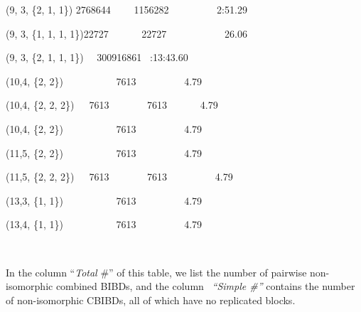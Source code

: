 \documentclass{article}
\newcommand{\tmem}[1]{{\em #1\/}}
\newcommand{\tmstrong}[1]{\textbf{#1}}
\newenvironment{tmparmod}[3]{\begin{list}{}{\setlength{\topsep}{0pt}\setlength{\leftmargin}{#1}\setlength{\rightmargin}{#2}\setlength{\parindent}{#3}\setlength{\listparindent}{\parindent}\setlength{\itemindent}{\parindent}\setlength{\parsep}{\parskip}} \item[]}{\end{list}}
\begin{document}
\begin{tmparmod}{0pt}{0pt}{0tab}
\begin{tmbothlined}
{{    {\hspace{3em}}(9, 3, \{2, 1, 1\}) {\hspace{4em}}2768644 \ \ \ \ 1156282 \
    \ \ \ \ \ \ \ \ 2:51.29
    
    {\hspace{3em}}(9, 3, \{1, 1, 1, 1\}){\hspace{4em}}22727 \ \ \ \ \ \ 22727
    \ \ \ \ \ \ \ \ \ \ \ 26.06
    
    {\hspace{3em}}(9, 3, \{2, 1, 1, 1\}) \ \ 300916861 \
    :13:43.60}
    
    {\hspace{3em}}(10,4, \{2, 2\})\quad \ \ \ {\hspace{3em}}  \ \ \
    \ \ \ \ 7613 \ \ \ \ \ \ \ \ \quad \ 4.79
    
    {\hspace{3em}}(10,4, \{2, 2, 2\})\quad \ \ \ {\hspace{3em}}7613 \ \ \ \ \
    \ \ 7613 \ \ \ \ \ \ {\hspace{3em}}4.79
    
    {\hspace{3em}}(10,4, \{2, 2\})\quad \ \ \ {\hspace{3em}}  \ \ \
    \ \ \ \ 7613 \ \ \ \ \ \ \ \ \quad \ 4.79
    
    {\hspace{3em}}(11,5, \{2, 2\})\quad \ \ \ {\hspace{3em}}  \ \ \
    \ \ \ \ 7613 \ \ \ \ \ \ \ \ \quad \ 4.79
    
    {\hspace{3em}}(11,5, \{2, 2, 2\})\quad \ \ \ {\hspace{3em}}7613 \ \ \ \ \
    \ \ 7613 \ \ \ \ \ \ \ \ \quad \ 4.79
    
    {\hspace{3em}}(13,3, \{1, 1\})\quad \ \ \ {\hspace{3em}}  \ \ \
    \ \ \ \ 7613 \ \ \ \ \ \ \ \ \quad \ 4.79
    
    {\hspace{3em}}(13,4, \{1, 1\})\quad \ \ \ {\hspace{3em}}  \ \ \
    \ \ \ \ 7613 \ \ \ \ \ \ \ \ \quad \ 4.79
    
    \ }
  \end{tmbothlined}
  
  In the {\tmem{{\tmstrong{}}}} column ``{\tmem{Total}} \#'' of this table, we
  list the number of pairwise non-isomorphic combined BIBDs, and the column \
  {\tmem{{\tmem{``{\tmem{Simple}} \#''{\tmem{}}}}}} contains the number of
  non-isomorphic CBIBDs, all of which have no replicated blocks.
  

\end{tmparmod}
\end{document}
